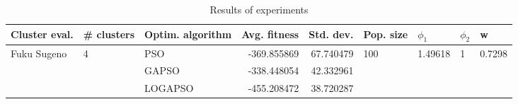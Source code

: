 \begin{table}
\centering
\caption{Results of experiments}
\begin{tabular}{lllrrllll}
\toprule
               Cluster eval. &        \# clusters & Optim. algorithm &  Avg. fitness &  Std. dev. &            Pop. size &               $\phi_{1}$ &         $\phi_{2}$ &                       w \\
\midrule
\multirow{3}{*}{Fuku Sugeno} & \multirow{3}{*}{4} &              PSO &   -369.855869 &  67.740479 & \multirow{3}{*}{100} & \multirow{3}{*}{1.49618} & \multirow{3}{*}{1} & \multirow{3}{*}{0.7298} \\
                             &                    &            GAPSO &   -338.448054 &  42.332961 &                      &                          &                    &                         \\
                             &                    &          LOGAPSO &   -455.208472 &  38.720287 &                      &                          &                    &                         \\
\bottomrule
\end{tabular}
\end{table}
